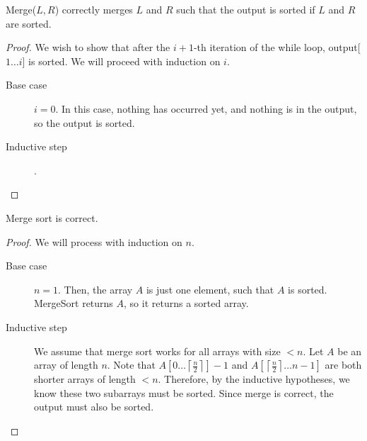 \begin{lemma}
	Merge(\( L,R \)) correctly merges \( L \) and \( R \) such that the output is sorted if \( L \) and \( R \) are sorted.
\end{lemma}
\begin{proof}
	We wish to show that after the \( i+1 \)-th iteration of the while loop, output[\( 1\ldots i \)] is sorted. We will proceed with induction on \( i \).
	\begin{description}
		\item[Base case] \( i = 0 \). In this case, nothing has occurred yet, and nothing is in the output, so the output is sorted.
		\item[Inductive step].
	\end{description}
\end{proof}

\begin{theorem}
	Merge sort is correct.
\end{theorem}
\begin{proof}
	We will process with induction on \( n \).
	\begin{description}
		\item[Base case] \( n=1 \). Then, the array \( A \) is just one element, such that \( A \) is sorted. MergeSort returns \( A \), so it returns a sorted array.
		\item[Inductive step] We assume that merge sort works for all arrays with size \( < n \). Let \( A \) be an array of length \( n \). Note that \( A[0\ldots \left\lceil \frac{n}{2} \right\rceil ]-1 \) and \( A[\left\lceil \frac{n}{2} \right\rceil \ldots n-1] \) are both shorter arrays of length \( <n \). Therefore, by the inductive hypotheses, we know these two subarrays must be sorted. Since merge is correct, the output must also be sorted.
	\end{description}
\end{proof}
